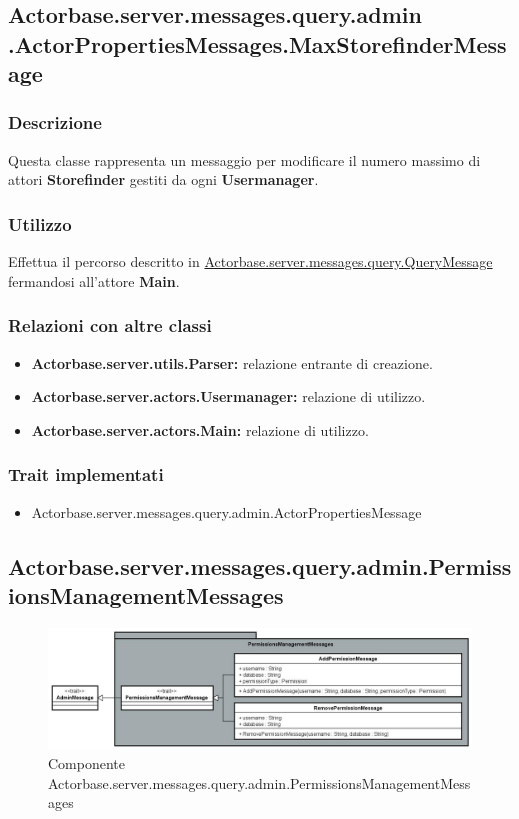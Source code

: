 \documentclass[a4paper]{article}
\begin{document}
		\subsection{Actorbase.server.messages.query.admin \newline
		.ActorPropertiesMessages.MaxStorefinderMessage}
			\subsubsection{Descrizione}
				Questa classe rappresenta un messaggio per modificare il numero massimo di attori \textbf{Storefinder} gestiti da ogni \textbf{Usermanager}.
				
			\subsubsection{Utilizzo}
				Effettua il percorso descritto in \hyperref[QueryMessage]{Actorbase.server.messages.query.QueryMessage} fermandosi all'attore 
				\textbf{Main}.
				
			\subsubsection{Relazioni con altre classi}
				\begin{itemize}
					\item \textbf{Actorbase.server.utils.Parser:} relazione entrante di creazione.
					\item \textbf{Actorbase.server.actors.Usermanager:} relazione di utilizzo.
					\item \textbf{Actorbase.server.actors.Main:} relazione di utilizzo.
				\end{itemize}
			\subsubsection{Trait implementati}
				\begin{itemize}
					\item Actorbase.server.messages.query.admin.ActorPropertiesMessage
				\end{itemize}
				
		\subsection{Actorbase.server.messages.query.admin.PermissionsManagementMessages}
		
			\begin{figure}[H]
				\centering
				\includegraphics[width=\textwidth]{ST/Server/userPermissionsManagementLevel.jpg}
				\caption{Componente Actorbase.server.messages.query.admin.PermissionsManagementMessages}
			\end{figure}
			
\end{document}
